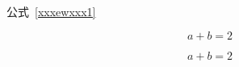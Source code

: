 \documentclass[10pt,hyperref,UTF8]{ctexbook}%
\newcommand\fileequalnumbernameone{公式}
\newcounter{fileequalnumber}[section]
\begin{document}
 
 

   {
	
	
	\centerline{\noindent\fileequalnumbernameone\ \ref{xxxewxxx1}}  
	\begin{tcolorbox}[arc=0pt ,
		boxsep=0mm ,
		top=1pt,
		bottom=1pt , 
		colback=sourcegrayone,
		colframe=sourcegrayone   
		] \label{xxxewxxx1} \noindent\begin{equation*}
		a + b = 2\end{equation*}\end{tcolorbox}
}
    
    {
    	
    	\begin{tcolorbox}\noindent\begin{equation*}
    		a + b = 2\end{equation*}\end{tcolorbox}
    }
    
 
	
	\backmatter
	
\end{document}
